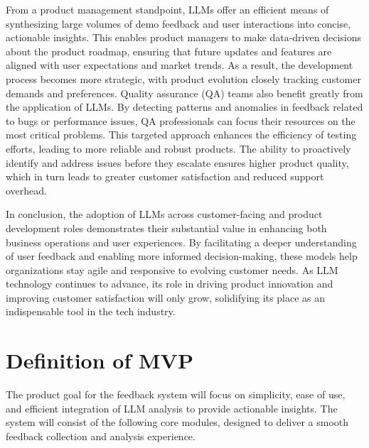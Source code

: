 \documentclass[journal,transmag]{IEEEtran}
\begin{document}
From a product management standpoint, LLMs offer an efficient means of synthesizing large volumes of demo feedback and user interactions into concise, actionable insights. This enables product managers to make data-driven decisions about the product roadmap, ensuring that future updates and features are aligned with user expectations and market trends. As a result, the development process becomes more strategic, with product evolution closely tracking customer demands and preferences. Quality assurance (QA) teams also benefit greatly from the application of LLMs. By detecting patterns and anomalies in feedback related to bugs or performance issues, QA professionals can focus their resources on the most critical problems. This targeted approach enhances the efficiency of testing efforts, leading to more reliable and robust products. The ability to proactively identify and address issues before they escalate ensures higher product quality, which in turn leads to greater customer satisfaction and reduced support overhead.

In conclusion, the adoption of LLMs across customer-facing and product development roles demonstrates their substantial value in enhancing both business operations and user experiences. By facilitating a deeper understanding of user feedback and enabling more informed decision-making, these models help organizations stay agile and responsive to evolving customer needs. As LLM technology continues to advance, its role in driving product innovation and improving customer satisfaction will only grow, solidifying its place as an indispensable tool in the tech industry.


\section{Definition of MVP}

The product goal for the feedback system will focus on simplicity, ease of use, and efficient integration of LLM analysis to provide actionable insights. The system will consist of the following core modules, designed to deliver a smooth feedback collection and analysis experience.
\end{document}
